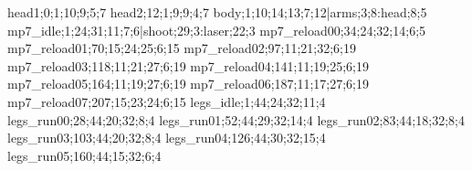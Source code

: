 head1;0;1;10;9;5;7
head2;12;1;9;9;4;7
body;1;10;14;13;7;12|arms;3;8:head;8;5
mp7_idle;1;24;31;11;7;6|shoot;29;3:laser;22;3
mp7_reload00;34;24;32;14;6;5
mp7_reload01;70;15;24;25;6;15
mp7_reload02;97;11;21;32;6;19
mp7_reload03;118;11;21;27;6;19
mp7_reload04;141;11;19;25;6;19
mp7_reload05;164;11;19;27;6;19
mp7_reload06;187;11;17;27;6;19
mp7_reload07;207;15;23;24;6;15
legs_idle;1;44;24;32;11;4
legs_run00;28;44;20;32;8;4
legs_run01;52;44;29;32;14;4
legs_run02;83;44;18;32;8;4
legs_run03;103;44;20;32;8;4
legs_run04;126;44;30;32;15;4
legs_run05;160;44;15;32;6;4
